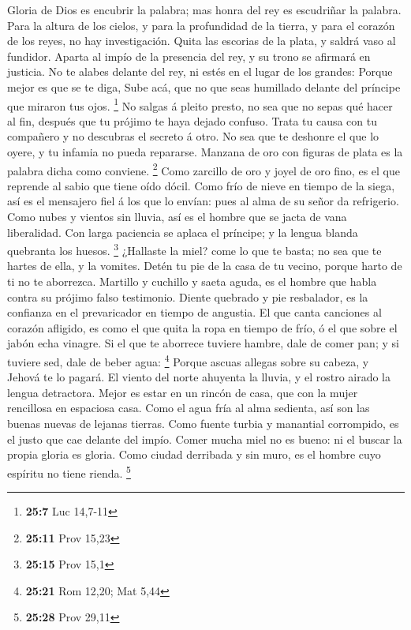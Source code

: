  Gloria de Dios es encubrir la palabra; mas honra del rey
es escudriñar la palabra.  Para la altura de los cielos, y
para la profundidad de la tierra, y para el corazón de los reyes, no hay
investigación.  Quita las escorias de la plata, y saldrá
vaso al fundidor.  Aparta al impío de la presencia del
rey, y su trono se afirmará en justicia.  No te alabes
delante del rey, ni estés en el lugar de los grandes: 
Porque mejor es que se te diga, Sube acá, que no que seas humillado
delante del príncipe que miraron tus ojos. \footnote{\textbf{25:7} Luc
  14,7-11}  No salgas á pleito presto, no sea que no sepas
qué hacer al fin, después que tu prójimo te haya dejado confuso.
 Trata tu causa con tu compañero y no descubras el secreto
á otro.  No sea que te deshonre el que lo oyere, y tu
infamia no pueda repararse.  Manzana de oro con figuras
de plata es la palabra dicha como conviene. \footnote{\textbf{25:11}
  Prov 15,23}  Como zarcillo de oro y joyel de oro fino,
es el que reprende al sabio que tiene oído dócil.  Como
frío de nieve en tiempo de la siega, así es el mensajero fiel á los que
lo envían: pues al alma de su señor da refrigerio.  Como
nubes y vientos sin lluvia, así es el hombre que se jacta de vana
liberalidad.  Con larga paciencia se aplaca el príncipe;
y la lengua blanda quebranta los huesos. \footnote{\textbf{25:15} Prov
  15,1}  ¿Hallaste la miel? come lo que te basta; no sea
que te hartes de ella, y la vomites.  Detén tu pie de la
casa de tu vecino, porque harto de ti no te aborrezca. 
Martillo y cuchillo y saeta aguda, es el hombre que habla contra su
prójimo falso testimonio.  Diente quebrado y pie
resbalador, es la confianza en el prevaricador en tiempo de angustia.
 El que canta canciones al corazón afligido, es como el
que quita la ropa en tiempo de frío, ó el que sobre el jabón echa
vinagre.  Si el que te aborrece tuviere hambre, dale de
comer pan; y si tuviere sed, dale de beber agua: \footnote{\textbf{25:21}
  Rom 12,20; Mat 5,44}  Porque ascuas allegas sobre su
cabeza, y Jehová te lo pagará.  El viento del norte
ahuyenta la lluvia, y el rostro airado la lengua detractora.
 Mejor es estar en un rincón de casa, que con la mujer
rencillosa en espaciosa casa.  Como el agua fría al alma
sedienta, así son las buenas nuevas de lejanas tierras. 
Como fuente turbia y manantial corrompido, es el justo que cae delante
del impío.  Comer mucha miel no es bueno: ni el buscar la
propia gloria es gloria.  Como ciudad derribada y sin
muro, es el hombre cuyo espíritu no tiene rienda. \footnote{\textbf{25:28}
  Prov 29,11}

